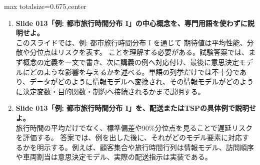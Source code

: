 \begin{adjustbox}{max totalsize={\textwidth}{0.675\textheight},center}
\begin{minipage}{\textwidth}
\begin{minipage}[t]{0.485\textwidth}
\begin{enumerate}
\item \textbf{Slide 013「例: 都市旅行時間分布 I」の中心概念を、専門用語を使わずに説明せよ。}\\このスライドでは、例: 都市旅行時間分布 I を通じて 期待値は平均性能、分散や分位点はリスクを表す。 ことを理解する必要がある。試験答案では、まず概念の定義を一文で書き、次に講義の例へ対応付け、最後に意思決定モデルにどのような影響を与えるかを述べる。単語の列挙だけでは不十分であり、データがどのように情報モデルへ変換され、その情報モデルがどのように決定変数・目的関数・制約へ接続されるかまで説明する。
\item \textbf{Slide 013「例: 都市旅行時間分布 I」を、配送またはTSPの具体例で説明せよ。}\\旅行時間の平均だけでなく、標準偏差や90\%分位点を見ることで遅延リスクを評価する。 答案では、例を出した後に、それがどのモデル要素に対応するかを明示する。例えば、顧客集合や旅行時間行列は情報モデル、訪問順序や車両割当は意思決定モデル、実際の配送指示は実装である。
\end{enumerate}
\end{minipage}
\end{minipage}
\end{adjustbox}

